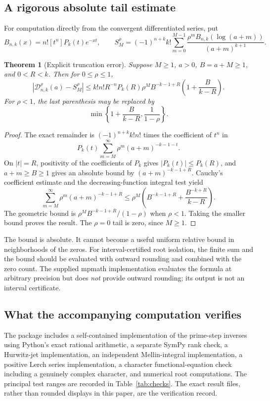 \documentclass[11pt]{article}
\newtheorem{theorem}{Theorem}[section]
\theoremstyle{definition}
\theoremstyle{remark}
\newcommand{\D}{\mathcal D}
\begin{document}
\subsection{A rigorous absolute tail estimate}
For computation directly from the convergent differentiated series, put
\begin{equation}\label{eq:Bnk}
 B_{n,k}(x)=n![t^n]P_k(t)e^{-xt},\qquad
 S_M^{\rho}=(-1)^{n+k}k!\sum_{m=0}^{M-1}
          \frac{\rho^m B_{n,k}(\log(a+m))}{(a+m)^{k+1}}.
\end{equation}

\begin{theorem}[Explicit truncation error]\label{thm:tail}
Suppose $M\geq1$, $a>0$, $B=a+M\geq1$, and $0<R<k$. Then for $0\leq\rho\leq1$,
\begin{equation}\label{eq:tail}
 |\D_{n,k}^{\rho}(a)-S_M^{\rho}|
 \leq k!n!R^{-n}P_k(R)\rho^M
       B^{-k-1+R}\left(1+\frac{B}{k-R}\right).
\end{equation}
For $\rho<1$, the last parenthesis may be replaced by
\begin{equation}\label{eq:tail-geometric}
 \min\left\{1+\frac{B}{k-R},\frac1{1-\rho}\right\}.
\end{equation}
\end{theorem}
\begin{proof}
The exact remainder is $(-1)^{n+k}k!n!$ times the coefficient of $t^n$ in
\[
 P_k(t)\sum_{m=M}^\infty\rho^m(a+m)^{-k-1-t}.
\]
On $|t|=R$, positivity of the coefficients of $P_k$ gives $|P_k(t)|\leq P_k(R)$, and $a+m\geq B\geq1$ gives an absolute bound by $(a+m)^{-k-1+R}$. Cauchy's coefficient estimate and the decreasing-function integral test yield
\[
 \sum_{m=M}^\infty\rho^m(a+m)^{-k-1+R}
 \leq\rho^M\left(B^{-k-1+R}
           +\frac{B^{-k+R}}{k-R}\right).
\]
The geometric bound is $\rho^M B^{-k-1+R}/(1-\rho)$ when $\rho<1$. Taking the smaller bound proves the result. The $\rho=0$ tail is zero, since $M\geq1$.
\end{proof}

The bound is absolute. It cannot become a useful uniform relative bound in neighborhoods of the zeros. For interval-certified root isolation, the finite sum and the bound should be evaluated with outward rounding and combined with the zero count. The supplied mpmath implementation evaluates the formula at arbitrary precision but does \emph{not} provide outward rounding; its output is not an interval certificate.

\subsection{What the accompanying computation verifies}
The package includes a self-contained implementation of the prime-step inverses using Python's exact rational arithmetic, a separate SymPy rank check, a Hurwitz-jet implementation, an independent Mellin-integral implementation, a positive Lerch series implementation, a character functional-equation check including a genuinely complex character, and numerical root computations. The principal test ranges are recorded in Table~\ref{tab:checks}. The exact result files, rather than rounded displays in this paper, are the verification record.
\end{document}
